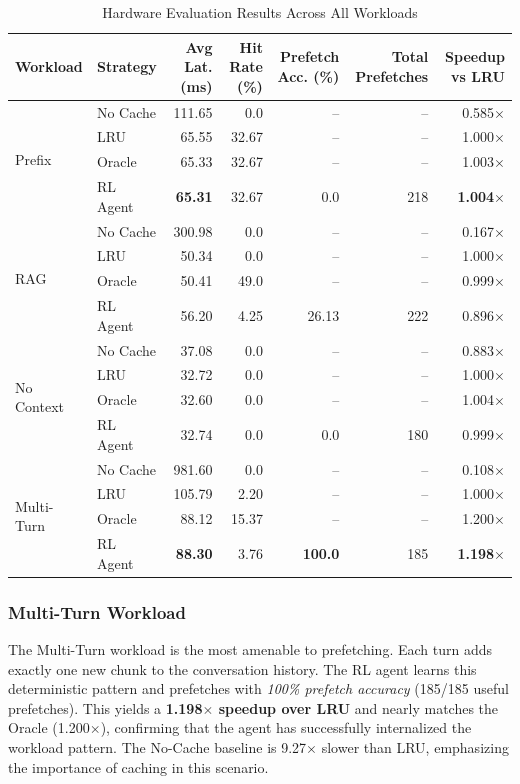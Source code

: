 \documentclass[conference]{IEEEtran}
\begin{document}
\begin{table}[htbp]
\centering
\caption{Hardware Evaluation Results Across All Workloads}
\label{tab:results}
\begin{tabular}{@{}llrrrrr@{}}
\toprule
\textbf{Workload} & \textbf{Strategy} & \textbf{Avg Lat. (ms)} & \textbf{Hit Rate (\%)} & \textbf{Prefetch Acc. (\%)} & \textbf{Total Prefetches} & \textbf{Speedup vs LRU} \\
\midrule
\multirow{4}{*}{Prefix} & No Cache & 111.65 & 0.0 & -- & -- & 0.585$\times$ \\
 & LRU & 65.55 & 32.67 & -- & -- & 1.000$\times$ \\
 & Oracle & 65.33 & 32.67 & -- & -- & 1.003$\times$ \\
 & RL Agent & \textbf{65.31} & 32.67 & 0.0 & 218 & \textbf{1.004$\times$} \\
\midrule
\multirow{4}{*}{RAG} & No Cache & 300.98 & 0.0 & -- & -- & 0.167$\times$ \\
 & LRU & 50.34 & 0.0 & -- & -- & 1.000$\times$ \\
 & Oracle & 50.41 & 49.0 & -- & -- & 0.999$\times$ \\
 & RL Agent & 56.20 & 4.25 & 26.13 & 222 & 0.896$\times$ \\
\midrule
\multirow{4}{*}{No Context} & No Cache & 37.08 & 0.0 & -- & -- & 0.883$\times$ \\
 & LRU & 32.72 & 0.0 & -- & -- & 1.000$\times$ \\
 & Oracle & 32.60 & 0.0 & -- & -- & 1.004$\times$ \\
 & RL Agent & 32.74 & 0.0 & 0.0 & 180 & 0.999$\times$ \\
\midrule
\multirow{4}{*}{Multi-Turn} & No Cache & 981.60 & 0.0 & -- & -- & 0.108$\times$ \\
 & LRU & 105.79 & 2.20 & -- & -- & 1.000$\times$ \\
 & Oracle & 88.12 & 15.37 & -- & -- & 1.200$\times$ \\
 & RL Agent & \textbf{88.30} & 3.76 & \textbf{100.0} & 185 & \textbf{1.198$\times$} \\
\bottomrule
\end{tabular}
\end{table}

\subsubsection{Multi-Turn Workload}

The Multi-Turn workload is the most amenable to prefetching. Each turn adds exactly one new chunk to the conversation history. The RL agent learns this deterministic pattern and prefetches with \emph{100\% prefetch accuracy} (185/185 useful prefetches). This yields a \textbf{1.198$\times$ speedup over LRU} and nearly matches the Oracle (1.200$\times$), confirming that the agent has successfully internalized the workload pattern. The No-Cache baseline is 9.27$\times$ slower than LRU, emphasizing the importance of caching in this scenario.
\end{document}
